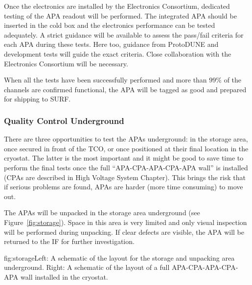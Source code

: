 Once the electronics are installed by the Electronics Consortium, dedicated testing of the APA readout will be performed. The integrated APA should be inserted in the cold box and the electronics performance can be tested adequately. A strict guidance will be available to assess the pass/fail criteria for each APA during these tests. Here too, guidance from ProtoDUNE and development tests will guide the exact criteria. Close collaboration with the Electronics Consortium will be necessary.

When all the tests have been successfully performed and more than $99\%$ of the channels are confirmed functional, the APA will be tagged as good and prepared for shipping to SURF.

\subsubsection{Quality Control Underground}
\label{sec:fdsp-apa-install-qc_underground}

There are three opportunities to test the APAs underground: in the storage area, once secured in front of the TCO, or once positioned at their final location in the cryostat. The latter is the most important and it might be good to save time to perform the final tests once the full ``APA-CPA-APA-CPA-APA wall'' is installed (CPAs are described in High Voltage System Chapter). This brings the risk that if serious problems are found, APAs are harder (more time consuming) to move out.

The APAs will be unpacked in the storage area underground (see Figure~\ref{fig:storage}). Space in this area is very limited and only visual inspection will be performed during unpacking. If clear defects are visible, the APA will be returned to the IF for further investigation.

\begin{dunefigure}{fig:storage}{Left: A schematic of the layout for the storage and unpacking area underground. Right: A schematic of the layout of a full APA-CPA-APA-CPA-APA wall installed in the cryostat.}
\setlength{\fboxsep}{0pt}
\setlength{\fboxrule}{0.5pt}
\end{dunefigure}

